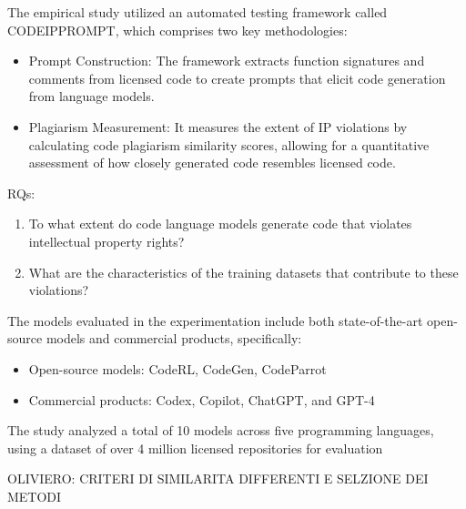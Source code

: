 \begin{tcolorbox}[title=Approach, colback=white, colframe=black, sharp corners=southwest, boxrule=0.8mm]


The empirical study utilized an automated testing framework called CODEIPPROMPT, which comprises two key methodologies:
\begin{itemize}
\item Prompt Construction: The framework extracts function signatures and comments from licensed code to create prompts that elicit code generation from language models.
\item Plagiarism Measurement: It measures the extent of IP violations by calculating code plagiarism similarity scores, allowing for a quantitative assessment of how closely generated code resembles licensed code.
\end{itemize}
RQs:
\begin{enumerate}

\item To what extent do code language models generate code that violates intellectual property rights?
\item What are the characteristics of the training datasets that contribute to these violations?
\end{enumerate}

The models evaluated in the experimentation include both state-of-the-art open-source models and commercial products, specifically:
\begin{itemize}
\item Open-source models: CodeRL, CodeGen, CodeParrot
\item Commercial products: Codex, Copilot, ChatGPT, and GPT-4
\end{itemize}

The study analyzed a total of 10 models across five programming languages, using a dataset of over 4 million licensed repositories for evaluation

OLIVIERO: CRITERI DI SIMILARITA DIFFERENTI E SELZIONE DEI METODI

\end{tcolorbox}
